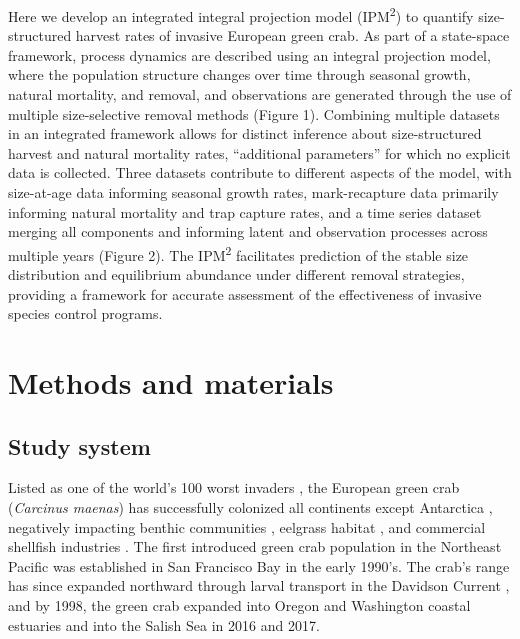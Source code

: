 \documentclass{article}
\begin{document}
Here we develop an integrated integral projection model (IPM\textsuperscript{2}) to quantify size-structured harvest rates of invasive European green crab. As part of a state-space framework, process dynamics are described using an integral projection model, where the population structure changes over time through seasonal growth, natural mortality, and removal, and observations are generated through the use of multiple size-selective removal methods (Figure 1). Combining multiple datasets in an integrated framework allows for distinct inference about size-structured harvest and natural mortality rates, “additional parameters” for which no explicit data is collected. Three datasets contribute to different aspects of the model, with size-at-age data informing seasonal growth rates, mark-recapture data primarily informing natural mortality and trap capture rates, and a time series dataset merging all components and informing latent and observation processes across multiple years (Figure 2). The IPM\textsuperscript{2} facilitates prediction of the stable size distribution and equilibrium abundance under different removal strategies, providing a framework for accurate assessment of the effectiveness of invasive species control programs.

\section{Methods and materials}

\subsection{Study system}

Listed as one of the world’s 100 worst invaders \parencite{lowe2000100}, the European green crab (\textit{Carcinus maenas}) has successfully colonized all continents except Antarctica \parencite{yamada2001global}, negatively impacting benthic communities \parencite{grosholz2005recent}, eelgrass habitat \parencite{garbary2014drastic, howard2019habitat}, and commercial shellfish industries \parencite{grosholz2011modeling}. The first introduced green crab population in the Northeast Pacific was established in San Francisco Bay in the early 1990's. The crab's range has since expanded northward through larval transport in the Davidson Current \parencite{yamada2021ocean}, and by 1998, the green crab expanded into Oregon and Washington coastal estuaries and into the Salish Sea in 2016 and 2017. 
\end{document}
